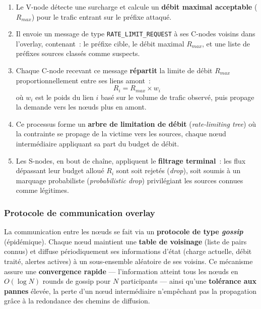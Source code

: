 \begin{enumerate}
    \item Le V-node détecte une surcharge et calcule un \textbf{débit maximal acceptable} ($R_{max}$) pour le trafic entrant sur le préfixe attaqué.

    \item Il envoie un message de type \texttt{RATE\_LIMIT\_REQUEST} à ses C-nodes voisins dans l'overlay, contenant~: le préfixe cible, le débit maximal $R_{max}$, et une liste de préfixes sources classés comme suspects.

    \item Chaque C-node recevant ce message \textbf{répartit} la limite de débit $R_{max}$ proportionnellement entre ses liens amont~:
    \begin{equation}
        R_i = R_{max} \times w_i
        \label{eq:rate_limit}
    \end{equation}
    où $w_i$ est le poids du lien $i$ basé sur le volume de trafic observé, puis propage la demande vers les n\oe{}uds plus en amont.

    \item Ce processus forme un \textbf{arbre de limitation de débit} (\textit{rate-limiting tree}) où la contrainte se propage de la victime vers les sources, chaque n\oe{}ud intermédiaire appliquant sa part du budget de débit.

    \item Les S-nodes, en bout de chaîne, appliquent le \textbf{filtrage terminal}~: les flux dépassant leur budget alloué $R_i$ sont soit rejetés (\textit{drop}), soit soumis à un marquage probabiliste (\textit{probabilistic drop}) privilégiant les sources connues comme légitimes.
\end{enumerate}

\subsubsection{Protocole de communication overlay}

La communication entre les n\oe{}uds se fait via un \textbf{protocole de type \textit{gossip}} (épidémique). Chaque n\oe{}ud maintient une \textbf{table de voisinage} (liste de pairs connus) et diffuse périodiquement ses informations d'état (charge actuelle, débit traité, alertes actives) à un sous-ensemble aléatoire de ses voisins. Ce mécanisme assure une \textbf{convergence rapide} --- l'information atteint tous les n\oe{}uds en $O(\log N)$ rounds de gossip pour $N$ participants --- ainsi qu'une \textbf{tolérance aux pannes} élevée, la perte d'un n\oe{}ud intermédiaire n'empêchant pas la propagation grâce à la redondance des chemins de diffusion.

